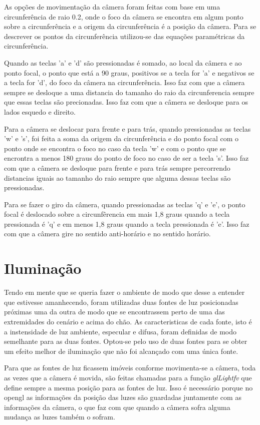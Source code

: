 \documentclass[
	12pt,				%
	openright,			%
	a4paper,			%
	english,			%
	french,				%
	spanish,			%
	brazil,				%
	]{abntex2}
\begin{document}
	As opções de movimentação da câmera foram feitas com base em uma circunferência de raio 0.2, onde o foco da câmera se encontra em algum ponto sobre a circunferência e a origem da circunferência é a posição da câmera. Para se descrever os pontos da circunferência utilizou-se das equações paramétricas da circunferência.

Quando as teclas 'a' e 'd' são pressionadas é somado, ao local da câmera e ao ponto focal, o ponto que está a 90 graus, positivos se a tecla for 'a' e negativos se a tecla for 'd', do foco da câmera na circunferência. Isso faz com que a câmera sempre se desloque a uma distancia do tamanho do raio da circunferencia sempre que essas teclas são precionadas. Isso faz com que a câmera se desloque para os lados esquedo e direito.

Para a câmera se deslocar para frente e para trás, quando pressionadas as teclas 'w' e 's', foi feita a soma da origem da circunferência e do ponto focal com o ponto onde se encontra o foco no caso da tecla 'w' e com o ponto que se encrontra a menos 180 graus do ponto de foco no caso de ser a tecla 's'. Isso faz com que a câmera se desloque para frente e para trás sempre percorrendo distancias iguais ao tamanho do raio sempre que alguma dessas teclas são pressionadas.         

Para se fazer o giro da câmera, quando pressionadas as teclas 'q' e 'e', o ponto focal é deslocado sobre a circunfêrencia em mais 1,8 graus quando a tecla pressionada é 'q' e em menos 1,8 graus quando a tecla pressionada é 'e'. Isso faz com que a câmera gire no sentido anti-horário e no sentido horário.

\section{Iluminação}

	Tendo em mente que se queria fazer o ambiente de modo que desse a entender que estivesse amanhecendo, foram utilizadas duas fontes de luz posicionadas próximas uma da outra de modo que se encontrassem perto de uma das extremidades do cenário e acima do chão. As caracteristicas de cada fonte, isto é a instensidade de luz ambiente, especular e difusa, foram definidas de modo semelhante para as duas fontes. Optou-se pelo uso de duas fontes para se obter um efeito melhor de iluminação que não foi alcançado com uma única fonte. 

Para que as fontes de luz ficassem imóveis conforme movimenta-se a câmera, toda as vezes que a câmera é movida, são feitas chamadas para a função \emph{glLightfv} que define sempre a mesma posição para as fontes de luz. Isso é necessário porque no opengl as informações da posição das luzes são guardadas juntamente com as informações da câmera, o que faz com que quando a câmera sofra alguma mudança as luzes também o sofram.    	
\end{document}
